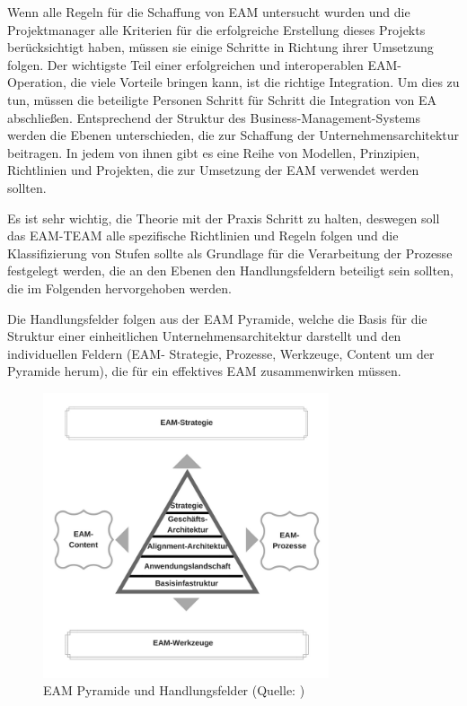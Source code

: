 \documentclass[doc]{apa6}
\begin{document}
Wenn alle Regeln für die Schaffung von EAM untersucht wurden und die Projektmanager alle Kriterien für die erfolgreiche Erstellung dieses Projekts berücksichtigt haben, müssen sie einige Schritte in Richtung ihrer Umsetzung folgen. Der wichtigste Teil einer erfolgreichen und interoperablen EAM-Operation, die viele Vorteile bringen kann, ist die richtige Integration. Um dies zu tun, müssen die beteiligte Personen Schritt für Schritt die Integration von EA abschließen. Entsprechend der Struktur des Business-Management-Systems werden die Ebenen unterschieden, die zur Schaffung der Unternehmensarchitektur beitragen. In jedem von ihnen gibt es eine Reihe von Modellen, Prinzipien, Richtlinien und Projekten, die zur Umsetzung der EAM verwendet werden sollten.

Es ist sehr wichtig, die Theorie mit der Praxis Schritt zu halten, deswegen soll das EAM-TEAM alle spezifische Richtlinien und Regeln folgen  und die Klassifizierung von Stufen sollte als Grundlage für die Verarbeitung der  Prozesse festgelegt werden, die an den Ebenen den Handlungsfeldern beteiligt sein sollten, die im Folgenden hervorgehoben werden.

Die Handlungsfelder folgen aus der EAM Pyramide, welche die Basis für die Struktur einer einheitlichen Unternehmensarchitektur darstellt und den individuellen Feldern (EAM- Strategie, Prozesse, Werkzeuge, Content um der Pyramide herum), die für ein effektives EAM zusammenwirken müssen.

\begin{figure}[!htbp]
\begin{center}
\includegraphics[width=0.75\textwidth]{Abbildungen/Pyramide.png}
\caption{EAM Pyramide und Handlungsfelder (Quelle: \cite{Keuntje2010})}
\label{fig:pyramide}
\end{center}
\end{figure}
\end{document}
